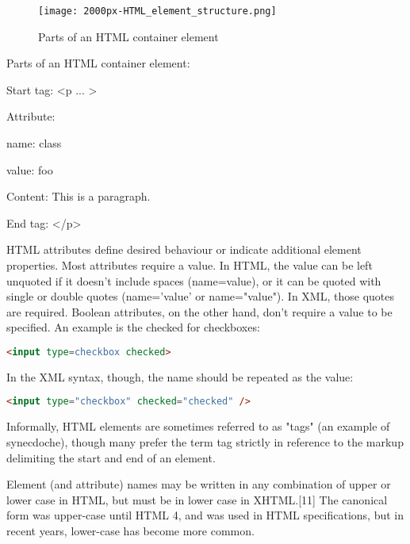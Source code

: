 \begin{figure}
\centering
\texttt{[image: 2000px-HTML\_element\_structure.png]}
\caption{Parts of an HTML container element}
\label{HTML_element_structure}
\end{figure}

Parts of an HTML container element:

\begin{compactitem}
\item Start tag: <p ... >
	\begin{compactitem}
	\item Attribute:
		\begin{compactitem}
		\item name: class
		\item value: foo
		\end{compactitem}
	\end{compactitem}
\item Content: This is a paragraph.
\item End tag: </p>
\end{compactitem}



HTML attributes define desired behaviour or indicate additional element properties. Most attributes require a value. In HTML, the value can be left unquoted if it doesn't include spaces (name=value), or it can be quoted with single or double quotes (name='value' or name="value"). In XML, those quotes are required. Boolean attributes, on the other hand, don't require a value to be specified. An example is the checked for checkboxes:



\begin{lstlisting}[language=HTML]
<input type=checkbox checked>
\end{lstlisting}

In the XML syntax, though, the name should be repeated as the value:

\begin{lstlisting}[language=HTML]
<input type="checkbox" checked="checked" />
\end{lstlisting}


Informally, HTML elements are sometimes referred to as "tags" (an example of synecdoche), though many prefer the term tag strictly in reference to the markup delimiting the start and end of an element.

Element (and attribute) names may be written in any combination of upper or lower case in HTML, but must be in lower case in XHTML.[11] The canonical form was upper-case until HTML 4, and was used in HTML specifications, but in recent years, lower-case has become more common.


